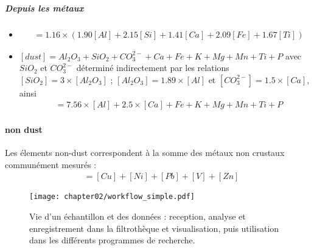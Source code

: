 \subparagraph{Depuis les métaux}
\begin{itemize}
    \item \autocite{malmSpatial1994}
      \begin{align*}
          [\text{dust}] &= 1.16 \times (1.90[Al] + 2.15[Si] + 1.41[Ca] + 2.09[Fe] + 1.67[Ti])
      \end{align*}
  \item \autocite{querolSource2002,perezCoarse2008}
      $[dust] = Al_2O_3 + SiO_2 + CO_3^{2-} + Ca + Fe + K + Mg + Mn + Ti + P$ avec
      $SiO_2$ et $CO_3^{2-}$ déterminé indirectement par les relations
      $[SiO_2] = 3 \times [Al_2O_3]$ ; $[Al_2O_3] = 1.89 \times [Al]$ et 
      $[CO_3^{2-}] = 1.5 \times [Ca]$, ainsi
      \begin{align*}
          [\text{dust}] &= 7.56 \times [Al] + 2.5 \times [Ca] + Fe + K + Mg + Mn + Ti + P
      \end{align*}
\end{itemize}

\paragraph{non dust} \autocite{salamehPM22015}
Les élements non-dust correspondent à la somme des métaux non crustaux communément mesurés :
\begin{align*}
    [\text{non dust}] &= [Cu] + [Ni] + [Pb] + [V] + [Zn]
\end{align*}


\begin{landscape}
\begin{figure}[ht]
    \centering
    \texttt{[image: chapter02/workflow\_simple.pdf]}
    \caption{Vie d'un échantillon et des données : reception, analyse et enregistrement
        dans la filtrothèque et visualisation, puis utilisation dans les différents
        programmes de recherche.}%
    \label{fig:bdd}
\end{figure}
\end{landscape}

